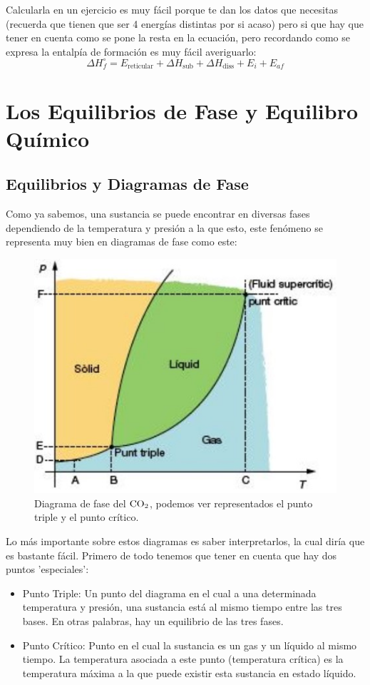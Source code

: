 \documentclass[arial,a4paper,print]{article}
\begin{document}
Calcularla en un ejercicio es muy fácil porque te dan los datos que necesitas (recuerda que tienen que ser 4 energías distintas por si acaso) pero si que hay que tener en cuenta como se pone la resta en la ecuación, pero recordando como se expresa la entalpía de formación es muy fácil averiguarlo:
\begin{equation*}
	\Delta H^{\circ}_{f} = E_{\text{reticular}} + \Delta H_{\text{sub}} + \Delta H_{\text{diss}} + E_{i} + E_{af}
\end{equation*}

\pagebreak
\section{Los Equilibrios de Fase y Equilibro Químico}

\subsection{Equilibrios y Diagramas de Fase}
Como ya sabemos, una sustancia se puede encontrar en diversas fases dependiendo de la temperatura y presión a la que esto, este fenómeno se representa muy bien en diagramas de fase como este:
\begin{figure}[H]
	\centering
	\includegraphics[width=0.5\linewidth]{figures/diagrama_fase}
	\caption{Diagrama de fase del $\ce{CO2}$, podemos ver representados el punto triple y el punto crítico.}
	\label{fig:diagramafase}
\end{figure}

Lo más importante sobre estos diagramas es saber interpretarlos, la cual diría que es bastante fácil. Primero de todo tenemos que tener en cuenta que hay dos puntos 'especiales':
\begin{itemize}
\item Punto Triple: Un punto del diagrama en el cual a una determinada temperatura y presión, una sustancia está al mismo tiempo entre las tres bases. En otras palabras, hay un equilibrio de las tres fases. 

\item Punto Crítico: Punto en el cual la sustancia es un gas y un líquido al mismo tiempo. La temperatura asociada a este punto (temperatura crítica) es la temperatura máxima a la que puede existir esta sustancia en estado líquido. 
\end{itemize}
 
\end{document}
